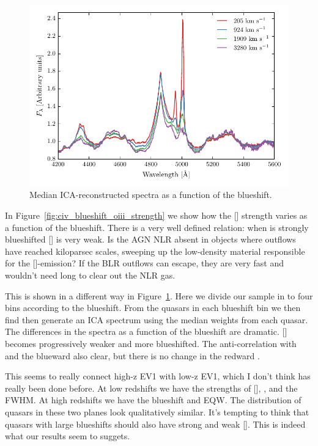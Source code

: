 \begin{figure}
    \centering
    \includegraphics[width=\columnwidth]{figures/chapter04/mfica_composites.pdf} 
    \caption{Median \ac{ICA}-reconstructed spectra as a function of the  blueshift.}     
    \label{fig:mfica_composites}
\end{figure}

In Figure~\ref{fig:civ_blueshift_oiii_strength} we show how the [] strength varies as a function of the  blueshift. 
There is a very well defined relation: when  is strongly blueshifted [] is very weak. 
Is the \ac{AGN} \ac{NLR} absent in objects where outflows have reached kiloparsec scales, sweeping up the low-density material responsible for the []-emission?
If the \ac{BLR} outflows can escape, they are very fast and wouldn't need long to clear out the \ac{NLR} gas. 

This is shown in a different way in Figure~\ref{fig:mfica_composites}. 
Here we divide our sample in to four bins according to the  blueshift. 
From the quasars in each  blueshift bin we then find then generate an \ac{ICA} spectrum using the median weights from each quasar. 
The differences in the spectra as a function of the  blueshift are dramatic. 
[] becomes progressively weaker and more blueshifted.
The anti-correlation with  and the blueward  also clear, but there is no change in the redward . 

This seems to really connect high-z \ac{EV1} with low-z \ac{EV1}, which I don't think has really been done before. 
At low redshifts we have the strengths of [], , and the \hb FWHM. 
At high redshifts we have the  blueshift and \ac{EQW}. 
The distribution of quasars in these two planes look qualitatively similar.  
It's tempting to think that quasars with large  blueshifts should also have strong  and weak []. 
This is indeed what our results seem to suggets. 

